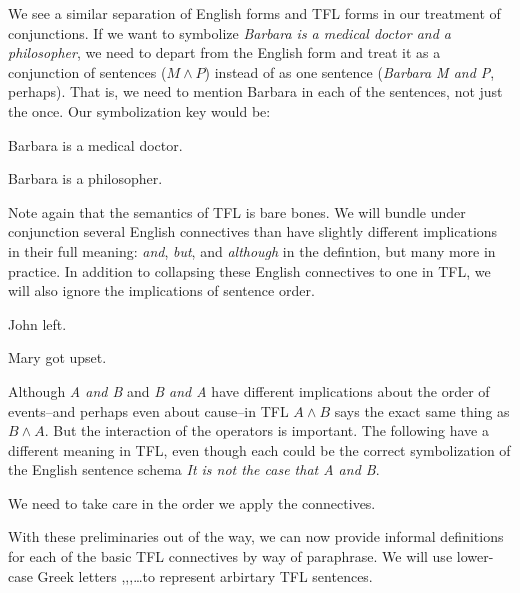 We see a similar separation of English forms and TFL forms in our
treatment of conjunctions. If we want to symbolize \emph{Barbara is a medical
  doctor and a philosopher}, we need to depart from the English form and treat
it as a conjunction of sentences ($M \land P$) instead of as one sentence
(\emph{Barbara M and P}, perhaps). That is, we need to mention Barbara in
each of the sentences, not just the once. Our symbolization key would be:

\begin{argument}
\item[M:] Barbara is a medical doctor.
\item[P:] Barbara is a philosopher.  
\end{argument}

Note again that the semantics of TFL is bare bones. We will bundle under
conjunction several English connectives than have slightly different
implications in their full meaning: \emph{and}, \emph{but}, and
\emph{although} in the defintion, but many more in practice. In addition to
collapsing these English connectives to one in TFL, we will also ignore the
implications of sentence order. 

\begin{argument}
\item[A:] John left.
\item[B:] Mary got upset.
\end{argument}

Although \emph{A and B} and \emph{B and A} have different implications
about the order of events--and perhaps even about cause--in TFL $A \land B$
says the exact same thing as $B \land A$. But the interaction of the operators
is important. The following have a different meaning in TFL, even though each
could be the correct symbolization of the English sentence schema \emph{It
  is not the case that A and B}.


We need to take care in the order we apply the connectives.

With these preliminaries out of the way, we can now provide informal definitions
for each of the basic TFL connectives by way of paraphrase. We will use
lower-case Greek letters \ephi,\epsi,\echi,\dots to represent arbirtary TFL
sentences.

